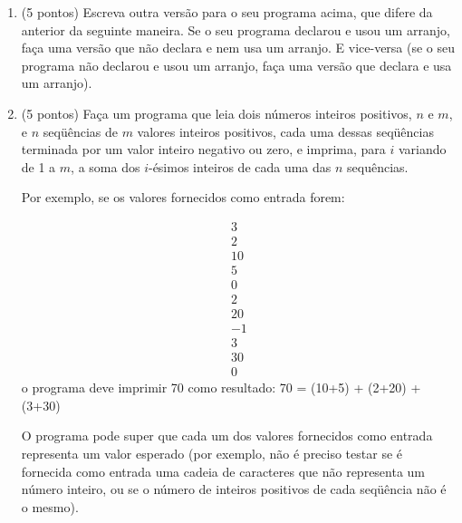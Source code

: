 \begin{enumerate}
O programa pode supor, em cada situa\c{c}\~ao de entrada de dados, que
o valor lido \'o esperado (por exemplo n\~ao \'e fornecida como
entrada nenhuma cadeia de caracteres que n\~ao representa um n\'umero
inteiro). Por exemplo, n\~ao \'e necess\'ario testar se o primeiro
valor lido (de $n$) representa de fato um valor positivo.

\item (5 pontos) Escreva outra vers\~ao para o seu programa acima, que
difere da anterior da seguinte maneira. Se o seu programa declarou e
usou um arranjo, fa\c{c}a uma vers\~ao que n\~ao declara e nem usa um
arranjo. E vice-versa (se o seu programa n\~ao declarou e usou um
arranjo, fa\c{c}a uma vers\~ao que declara e usa um arranjo).

\item (5 pontos) Fa\c{c}a um programa que leia dois n\'umeros inteiros
positivos, $n$ e $m$, e $n$ seq\"u\^encias de $m$ valores inteiros
positivos, cada uma dessas seq\"u\^encias terminada por um valor
inteiro negativo ou zero, e imprima, para $i$ variando de 1 a $m$, a
soma dos $i$-\'esimos inteiros de cada uma das $n$ sequ\^encias.

Por exemplo, se os valores fornecidos como entrada forem:
  
  \[ \begin{array}{l}
        3    \\
        2    \\
        10   \\
        5    \\
        0    \\
        2    \\
        20   \\
        -1   \\
        3    \\
        30   \\
        0
      \end{array} \]
o programa deve imprimir 70 como resultado: 
  70 = (10+5) + (2+20) + (3+30) 

O programa pode super que cada um dos valores fornecidos como entrada
representa um valor esperado (por exemplo, n\~ao \'e preciso testar se
\'e fornecida como entrada uma cadeia de caracteres que n\~ao
representa um n\'umero inteiro, ou se o n\'umero de inteiros positivos
de cada seq\"u\^encia n\~ao \'e o mesmo).

\end{enumerate}



